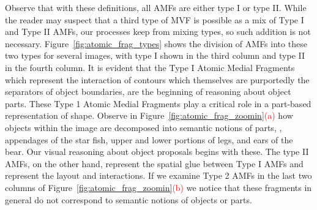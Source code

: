 Observe that with these definitions, all AMFs are either type I or type II. While the reader may suspect that a third type of MVF is possible as a mix of Type I and Type II AMFs, our processes keep from mixing types, so such addition is not necessary. Figure~\ref{fig:atomic_frag_types} shows the division of AMFs into these two types for several images, with type I shown in the third column and type II in the fourth column. It is evident that the Type I Atomic Medial Fragments which represent the interaction of contours which themselves are purportedly the separators of object boundaries, are the beginning of reasoning about object parts. These Type 1 Atomic Medial Fragments play a critical role in a part-based representation of shape. Observe in Figure~\ref{fig:atomic_frag_zoomin}\textcolor{red}{(a)} how objects within the image are decomposed into semantic notions of parts, \ie, appendages of the star fish, upper and lower portions of legs, and ears of the bear. Our visual reasoning about object proposals begins with these. The type II AMFs, on the other hand, represent the spatial glue between Type I AMFs and represent the layout and interactions. If we examine Type 2 AMFs in the last two columns of Figure~\ref{fig:atomic_frag_zoomin}\textcolor{red}{(b)} we notice that these fragments in general do not correspond to semantic notions of objects or parts. 

